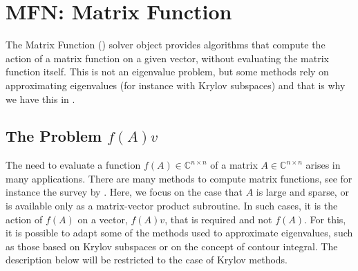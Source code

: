 \chapter{\label{cap:mfn}MFN: Matrix Function}


\noindent The Matrix Function () solver object provides algorithms that compute the action of a matrix function on a given vector, without evaluating the matrix function itself. This is not an eigenvalue problem, but some methods rely on approximating eigenvalues (for instance with Krylov subspaces) and that is why we have this in \slepc.

\section{\label{sec:mfn}The Problem $f(A)v$}

The need to evaluate a function $f(A)\in\mathbb{C}^{n\times n}$ of a matrix $A\in\mathbb{C}^{n\times n}$ arises in many applications. There are many methods to compute matrix functions, see for instance the survey by \cite{Higham:2010:CMF}.
Here, we focus on the case that $A$ is large and sparse, or is available only as a matrix-vector product subroutine. In such cases, it is the action of $f(A)$ on a vector, $f(A)v$, that is required and not $f(A)$. For this, it is possible to adapt some of the methods used to approximate eigenvalues, such as those based on Krylov subspaces or on the concept of contour integral. The description below will be restricted to the case of Krylov methods.

